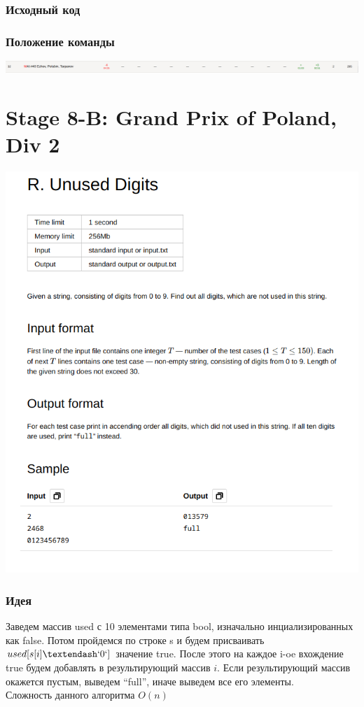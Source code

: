 \documentclass[12pt]{article}
\begin{document}
\subsubsection*{Исходный код}

\subsubsection*{Положение команды}
\includegraphics[scale=0.5]{images/7.png}\newline\noindent


\pagebreak
\section{Stage 8-B: Grand Prix of Poland, Div 2}
\includegraphics[scale=0.75]{statements/8_R.png}
\subsubsection*{Идея}
Заведем массив used с 10 элементами типа bool, изначально инциализированных как false. Потом пройдемся по строке s и будем присваивать 
$used[s[i] – `0`]$ значение true. После этого на каждое i-oe вхождение true будем добавлять в результирующий массив $i$. Если результирующий 
массив окажется пустым, выведем “full”, иначе выведем все его элементы.
\\ 
Сложность данного алгоритма $O(n)$
\end{document}
